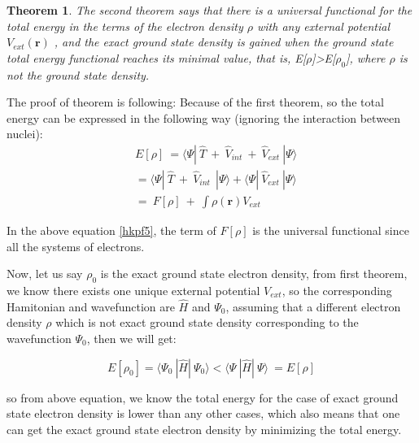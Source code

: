 \documentclass[a4paper]{report}
\newtheorem{thm}{Theorem}
\begin{document}
\begin{thm}
\label{hk2}
\noindent The second theorem says that there is a universal functional for the total energy in the terms of the electron density $\rho$ with any external potential $V_\textit{ext}(\textbf{r})$ ,
and the exact ground state density is gained when the ground state total energy functional reaches its minimal value, that is, E[$\rho$]>E[$\rho_0$], where $\rho$ is not the ground state density.
\end{thm}

\noindent The proof of theorem is following:
Because of the first theorem, so the total energy can be expressed in the following way (ignoring the interaction between nuclei):
\begin{equation}\label{hkpf5}\begin{split}
& E[\rho] \ =\langle \Psi  | \ \hat{T} \ + \ \hat{V}_\textit{int}  \ + \ \hat{V}_\textit{ext} \ | \Psi \rangle \\
&     =\langle \Psi  | \ \hat{T} \ + \ \hat{V}_\textit{int}  \ \ | \Psi \rangle+ \langle \Psi  | \ \hat{V}_\textit{ext} \ | \Psi \rangle \\
&     =\ F[\rho] \ + \ \int \rho(\textbf{r}) V_\textit{ext} 
\end{split}
\end{equation}

\noindent In the above equation \ref{hkpf5}, the term of $F[\rho]$ is the universal functional since all the systems of electrons.

\noindent Now, let us say $\rho_0$ is the exact ground state electron density, from first theorem, we know there exists one unique external potential $V_\textit{ext}$, so 
the corresponding Hamitonian and wavefunction are $\hat{H}$ and $\Psi_0$, assuming that a different electron density $\rho$ which is not exact ground state density 
corresponding to the wavefunction $\Psi_0$, then we will get:

\begin{equation}
E[\rho_0] = \langle \Psi_0\ |\hat{H}|\ \Psi_0 \rangle 
          < \langle \Psi\ |\hat{H}|\ \Psi \rangle \
          = E[\rho]
\end{equation}

\noindent so from above equation, we know the total energy for the case of exact ground state electron density is lower than any other cases, which also means that one can get 
the exact ground state electron density by minimizing the total energy.
\end{document}
